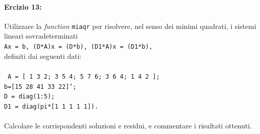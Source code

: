 \documentclass[12pt]{article}
\begin{document}
\paragraph{Ercizio 13:}Utilizzare la \textit{function} \texttt{miaqr} per risolvere, nel senso dei minimi quadrati, i sistemi lineari sovradeterminati\\
\texttt{Ax = b, \;\;\;\;\;\;(D*A)x = (D*b),\;\;\;\;\;\; (D1*A)x = (D1*b),}\\
definiti dai seguenti dati:\\\\
\texttt{
A = [ 1 3 2; 3 5 4; 5 7 6; 3 6 4; 1 4 2 ]; \\
b=[15 28 41 33 22]';\\
D = diag(1:5);\\
D1 = diag(pi*[1 1 1 1 1]).}\\\\
Calcolare le corrispondenti soluzioni e residui, e commentare i risultati ottenuti.
\end{document}
